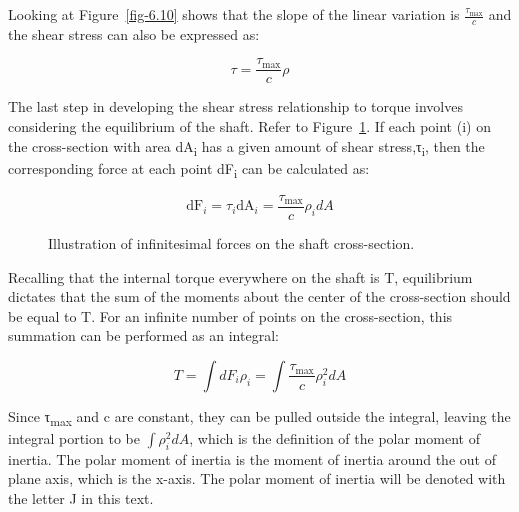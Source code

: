 \documentclass[
  letterpaper,
  DIV=11,
  numbers=noendperiod]{scrreprt}
\theoremstyle{definition}
\theoremstyle{remark}
\begin{document}
Looking at Figure~\ref{fig-6.10} shows that the slope of the linear
variation is \(\frac{\tau_{\max }}{c}\) and the shear stress can also be
expressed as:

\[
\tau=\frac{\tau_{\max }}{c} \rho
\]

The last step in developing the shear stress relationship to torque
involves considering the equilibrium of the shaft. Refer to
Figure~\ref{fig-6.11}. If each point (i) on the cross-section with area
dA\textsubscript{i} has a given amount of shear
stress,τ\textsubscript{i}, then the corresponding force at each point
dF\textsubscript{i} can be calculated as:

\[
\mathrm{dF}_i=\tau_i \mathrm{dA}_i=\frac{\tau_{\max }}{c} \rho_i d A
\]

\begin{figure}


\caption{\label{fig-6.11}Illustration of infinitesimal forces on the
shaft cross-section.}

\end{figure}%

Recalling that the internal torque everywhere on the shaft is T,
equilibrium dictates that the sum of the moments about the center of the
cross-section should be equal to T. For an infinite number of points on
the cross-section, this summation can be performed as an integral:

\[
T=\int d F_i \rho_i=\int \frac{\tau_{\max }}{c} \rho_i^2 d A
\]

Since τ\textsubscript{max} and c are constant, they can be pulled
outside the integral, leaving the integral portion to be
\(\int \rho_i^2 d A\), which is the definition of the polar moment of
inertia. The polar moment of inertia is the moment of inertia around the
out of plane axis, which is the x-axis. The polar moment of inertia will
be denoted with the letter J in this text.
\end{document}
